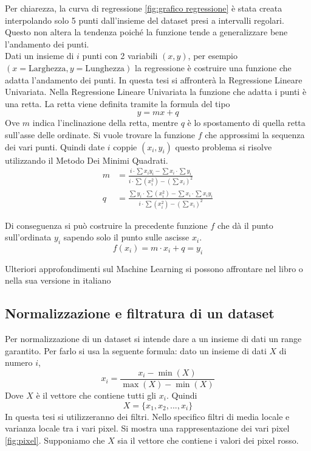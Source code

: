 Per chiarezza, la curva di regressione \ref{fig:grafico regressione} è stata creata interpolando solo 5 punti dall'insieme del dataset presi a intervalli regolari. Questo non altera la tendenza poiché la funzione tende a generalizzare bene l'andamento dei punti.\\
Dati un insieme di $i$ punti con 2 variabili $(x,y)$,  per esempio
$(x=\text{Larghezza},y=\text{Lunghezza})$ la regressione è costruire una funzione che adatta l'andamento
dei punti. In questa tesi si affronterà la Regressione Lineare Univariata. Nella Regressione Lineare Univariata la funzione che adatta i punti è una retta.
La retta viene definita tramite la formula del tipo
\[
y=mx+q
\] 
Ove $m$ indica l'inclinazione della retta, mentre $q$ è lo spostamento di quella retta sull'asse delle ordinate.
Si vuole trovare la funzione $f$ che approssimi la sequenza dei vari punti.
Quindi date $i$ coppie $(x_i,y_i)$ questo problema si risolve utilizzando il Metodo Dei Minimi Quadrati. 
\begin{align}
    m&=\frac{i\cdot \sum x_iy_i- \sum x_i \cdot \sum y_i}
    {i \cdot \sum (x_i^2)- \left(\sum x_i \right)^2}\\
    q&=\frac{\sum y_i \cdot \sum (x_i^2)- \sum x_i \cdot \sum x_iy_i}
    {i \cdot \sum (x_i^2)- \left(\sum x_i \right)^2}
\end{align}

Di conseguenza si può costruire la precedente funzione $f$ che dà il punto sull'ordinata $y_i$ sapendo solo il punto sulle ascisse $x_i$.
\[
f(x_i)=m\cdot x_i+q=y_i
\]

Ulteriori approfondimenti sul Machine Learning si possono affrontare nel libro \cite{russell2010artificial} o nella sua versione in italiano \cite{Russell2022-re}

\subsection{Normalizzazione e filtratura di un dataset}
\label{subsec:normalizzazione_dataset}
Per normalizzazione di un dataset si intende dare a un insieme di dati un range garantito. 
Per farlo si usa la seguente formula: dato un insieme di dati $X$ di numero $i$, 
\[
    x_i=\frac{x_i-\min(X)}{\max(X)-\min(X)}
\]
Dove $X$ è il vettore che contiene tutti gli $x_i$. Quindi
\[
    X=\{x_1,x_2,...,x_i\}
\]
In questa tesi si utilizzeranno dei filtri. Nello specifico filtri di media locale e varianza locale tra i vari pixel. 
Si mostra una rappresentazione dei vari pixel \ref{fig:pixel}. 
Supponiamo che $X$ sia il vettore che contiene i valori 
dei pixel rosso.

